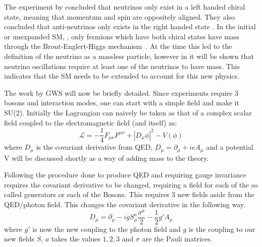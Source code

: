 The experiment by \citeauthor{1Helicity} concluded that neutrinos only exist in a left handed chiral state, meaning that momentum and spin are oppositely aligned. They also concluded that anti-neutrinos only exists in the right handed state \cite{1Helicity}. In the initial or unexpanded SM, \cite{34doi:10.1142/9789812562203_0002}, only fermions which have both chiral states have mass through the Brout\hyp{}Englert\hyp{}Higgs mechanism~\cite{35Higgs}. At the time this led to the definition of the neutrino as a massless particle, however in  it will be shown that neutrino oscillations require at least one of the neutrinos to have mass. This indicates that the SM needs to be extended to account for this new physics.


The work by GWS will now be briefly detailed. Since experiments require 3 bosons and interaction modes, one can start with a simple field and make it SU(2). Initially the Lagrangian can naively be taken as that of a complex scalar field coupled to the electromagnetic field (and itself) as:
\begin{equation}
\mathcal{L} = - \frac{1}{4} F_{\mu\nu}F^{\mu\nu} + |D_\mu \phi |^2  -V(\phi)
\end{equation}
where $D_\mu$ is the covariant derivative from QED, $D_\mu = \partial_\mu +ieA_\mu$ and a potential V will be discussed shortly as a way of adding mass to the theory.

Following the procedure done to produce QED and requiring gauge invariance requires the covariant derivative to be changed, requiring a field for each of the so called generators or each of the Bosons. This requires 3 new fields aside from the QED/photon field. This changes the covariant derivative in the following way.
\begin{equation}
D_\mu = \partial_\mu - ig S^a_\mu \frac{\sigma^a}{2} - \frac{1}{2}g' A_\mu
\end{equation}
where $g'$ is now the new coupling to the photon field and $g$ is the coupling to our new fields $S$, $a$ takes the values ${1,2,3}$ and $\sigma$ are the Pauli matrices.

